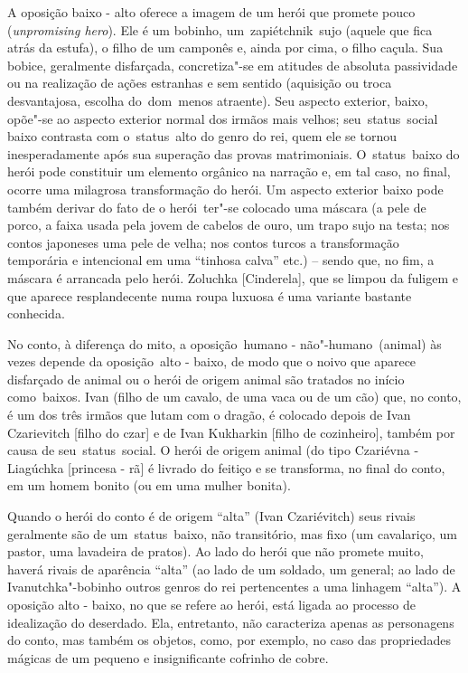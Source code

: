 A oposição baixo - alto oferece a imagem de um herói que promete pouco
(\emph{{unpromising hero}}). Ele é um bobinho, um~{zapiétchnik}~sujo
(aquele que fica atrás da estufa), o filho de um camponês e, ainda por
cima, o filho caçula. Sua bobice, geralmente disfarçada, concretiza"-se
em atitudes de absoluta passividade ou na realização de ações estranhas
e sem sentido (aquisição ou troca desvantajosa, escolha do~dom~menos
atraente). Seu aspecto exterior, baixo, opõe"-se ao aspecto exterior
normal dos irmãos mais velhos; seu~{status}~social baixo contrasta com
o~{status}~alto do genro do rei, quem ele se tornou inesperadamente após
sua superação das provas matrimoniais. O~{status}~baixo do herói pode
constituir um elemento orgânico na narração e, em tal caso, no final,
ocorre uma milagrosa transformação do herói. Um aspecto exterior baixo
pode também derivar do fato de o herói~ter"-se colocado uma máscara (a
pele de porco, a faixa usada pela jovem de cabelos de ouro, um trapo
sujo na testa; nos contos japoneses uma pele de velha; nos contos turcos
a transformação temporária e intencional em uma ``tinhosa calva'' etc.)
-- sendo que, no fim, a máscara é arrancada pelo herói. Zoluchka
{[}Cinderela{]}, que se limpou da fuligem e que aparece resplandecente
numa roupa luxuosa é uma variante bastante conhecida.

No conto, à diferença do mito, a oposição~{humano -
não"-humano}~({animal}) às vezes depende da oposição~{alto - baixo}, de
modo que o noivo que aparece disfarçado de animal ou o herói de origem
animal são tratados no início como~{baixos}. Ivan (filho de um cavalo,
de uma vaca ou de um cão) que, no conto, é um dos três irmãos que lutam
com o dragão, é colocado depois de Ivan Czarievitch {[}filho do czar{]}
e de Ivan Kukharkin {[}filho de cozinheiro{]}, também por causa de
seu~{status}~social. O herói de origem animal (do tipo Czariévna -
Liagúchka {[}princesa - rã{]} é livrado do feitiço e se transforma, no
final do conto, em um homem bonito (ou em uma mulher bonita).

Quando o herói do conto é de origem ``alta'' (Ivan Czariévitch) seus
rivais geralmente são de um~{status}~baixo, não transitório, mas fixo
(um cavalariço, um pastor, uma lavadeira de pratos). Ao lado do herói
que não promete muito, haverá rivais de aparência ``alta'' (ao lado de
um soldado, um general; ao lado de Ivanutchka"-bobinho outros genros do
rei pertencentes a uma linhagem ``alta''). A oposição alto - baixo, no
que se refere ao herói, está ligada ao processo de idealização do
deserdado. Ela, entretanto, não caracteriza apenas as personagens do
conto, mas também os objetos, como, por exemplo, no caso das
propriedades mágicas de um pequeno e insignificante cofrinho de cobre.

